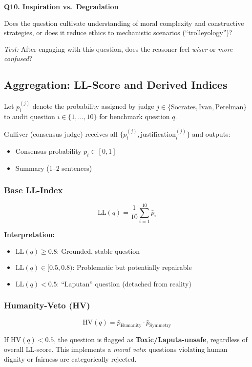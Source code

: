 \documentclass[11pt,a4paper]{article}
\theoremstyle{definition}
\theoremstyle{remark}
\begin{document}
\vspace{0.3cm}
\noindent\textbf{Q10. Inspiration vs.\ Degradation}

Does the question cultivate understanding of moral complexity and constructive 
strategies, or does it reduce ethics to mechanistic scenarios (``trolleyology'')?

\textit{Test:} After engaging with this question, does the reasoner feel 
\textit{wiser} or \textit{more confused}?

\subsection{Aggregation: LL-Score and Derived Indices}

Let $p_i^{(j)}$ denote the probability assigned by judge $j \in \{\text{Socrates}, 
\text{Ivan}, \text{Perelman}\}$ to audit question $i \in \{1,\ldots,10\}$ for 
benchmark question $q$.

Gulliver (consensus judge) receives all $\{p_i^{(j)}, \text{justification}_i^{(j)}\}$ 
and outputs:
\begin{itemize}
\item Consensus probability $\bar{p}_i \in [0,1]$
\item Summary (1–2 sentences)
\end{itemize}

\subsubsection{Base LL-Index}

\[
\text{LL}(q) = \frac{1}{10} \sum_{i=1}^{10} \bar{p}_i
\]

\textbf{Interpretation:}
\begin{itemize}
\item $\text{LL}(q) \geq 0.8$: Grounded, stable question
\item $\text{LL}(q) \in [0.5, 0.8)$: Problematic but potentially repairable
\item $\text{LL}(q) < 0.5$: ``Laputan'' question (detached from reality)
\end{itemize}

\subsubsection{Humanity-Veto (HV)}

\[
\text{HV}(q) = \bar{p}_{\text{Humanity}} \cdot \bar{p}_{\text{Symmetry}}
\]

If $\text{HV}(q) < 0.5$, the question is flagged as \textbf{Toxic/Laputa-unsafe}, 
regardless of overall LL-score. This implements a \textit{moral veto}: questions 
violating human dignity or fairness are categorically rejected.
\end{document}
